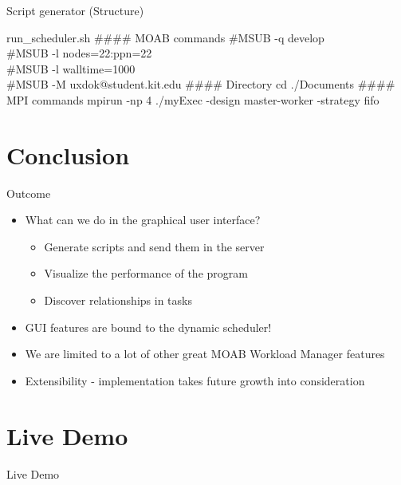 \documentclass[18pt]{beamer}
\begin{document}
	
	
	\begin{frame}{Script generator (Structure)}
		
		\begin{block}{run\_scheduler.sh}
		        \#\#\#\# MOAB commands
		        \newline
		        \newline
				\#MSUB  -q develop\\
				\#MSUB  -l nodes=22:ppn=22\\
				\#MSUB  -l walltime=1000\\
				\#MSUB  -M uxdok@student.kit.edu
				\newline
				\newline
        				\#\#\#\# Directory
				\newline
				\newline
				cd ./Documents
				\newline
				\newline
        				\#\#\#\# MPI commands
        			\newline
        			\newline
				mpirun -np 4 ./myExec -design master-worker -strategy fifo
			
		\end{block}
	\end{frame}

\section{Conclusion}
	
	
\begin{frame}{Outcome}
\begin{itemize}
\item What can we do in the graphical user interface?	
\begin{itemize}
			\pause
			 \item Generate scripts and send them in the server
			 \item Visualize the performance of the program 
			 \item Discover relationships in tasks
\end{itemize}
\pause
\item GUI features are bound to the dynamic scheduler!
\pause
\item  \Frowny{} We are limited to a lot of other great MOAB Workload Manager features
			
\pause
\item \Smiley{} Extensibility - implementation takes future growth into consideration 
	\end{itemize}
		
	\end{frame}
	
	
	
\section{Live Demo}
	
	
	\begin{frame}
		\begin{center}
			Live Demo
		\end{center}		
	\end{frame}
	
\end{document}
